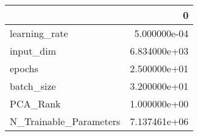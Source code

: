 \begin{tabular}{lr}
\toprule
{} &             0 \\
\midrule
learning\_rate          &  5.000000e-04 \\
input\_dim              &  6.834000e+03 \\
epochs                 &  2.500000e+01 \\
batch\_size             &  3.200000e+01 \\
PCA\_Rank               &  1.000000e+00 \\
N\_Trainable\_Parameters &  7.137461e+06 \\
\bottomrule
\end{tabular}
